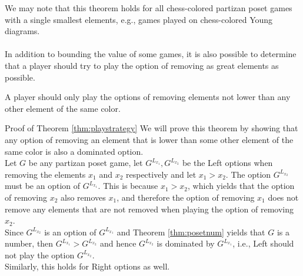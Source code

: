 We may note that this theorem holds for all chess-colored partizan poset games with a single smallest elements, e.g., games played on chess-colored Young diagrams.
\\\\
In addition to bounding the value of some games, it is also possible to determine that a player should try to play the option of removing as great elements as possible.
\begin{thm}
\label{thm:playstrategy}
A player should only play the options of removing elements not lower than any other element of the same color.
\end{thm}
\begin{proof2}{Proof of Theorem \ref{thm:playstrategy}}
We will prove this theorem by showing that any option of removing an element that is lower than some other element of the same color is also a dominated option. 
\\
Let $G$ be any partizan poset game, let $G^{L_{x_1}},G^{L_{x_2}}$ be the Left options when removing the elements $x_1$ and $x_2$ respectively and let $x_1>x_2$.
The option $G^{L_{x_2}}$ must be an option of $G^{L_{x_1}}$. This is because $x_1>x_2$, which yields that the option of removing $x_2$ also removes $x_1$, and therefore the option of removing $x_1$ does not remove any elements that are not removed when playing the option of removing $x_2$. 
\\
Since $G^{L_{x_2}}$ is an option of $G^{L_{x_1}}$ and Theorem \ref{thm:posetnum} yields that $G$ is a number, then $G^{L_{x_1}}>G^{L_{x_2}}$ and hence $G^{L_{x_2}}$ is dominated by $G^{L_{x_1}}$, i.e., Left should not play the option $G^{L_{x_2}}$.
\\
Similarly, this holds for Right options as well.
\end{proof2}
\newpage
%

